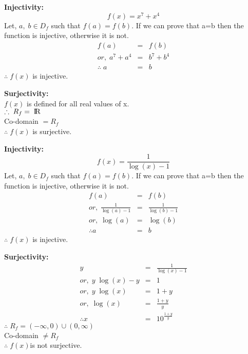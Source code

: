 \documentclass{article}
\begin{document}
\begin{minipage}[t]{0.4\linewidth}
\textbf{Injectivity:}
    $$f(x) = x^7 + x^4$$
Let, $a,\;b\in D_f$ such that $f(a) = f(b)$. If we can prove that a=b then the function is injective, otherwise it is not.
\begin{eqnarray*}
    f(a) &=& f(b)\\
    or,\;a^7+a^4 &=& b^7 + b^4\\
    \therefore\; a &=& b
\end{eqnarray*}
$\therefore\;f(x)$ is injective.
\end{minipage}\hfill
\begin{minipage}[t]{0.4\linewidth}
\textbf{Surjectivity:}
\\$f(x)$ is defined for all real values of x.\\
$\therefore\; R_f = \;\rm I\!R$
\\Co-domain $=R_f$\\
$\therefore\;f(x)$ is surjective.
\end{minipage}
\vspace{1cm}
\vspace{1cm}
\newpage

\begin{minipage}[t]{0.4\linewidth}
\textbf{Injectivity:}
    $$f(x) = \frac{1}{\log{(x)}-1}$$
Let, $a,\;b\in D_f$ such that $f(a) = f(b)$. If we can prove that a=b then the function is injective, otherwise it is not.
\begin{eqnarray*}
    f(a) &=& f(b)\\
    or,\;\frac{1}{\log{(a)}-1} &=& \frac{1}{\log{(b)}-1}\\
    or,\; \log(a) &=& \log(b)\\
    \therefore a&=&b
\end{eqnarray*}
    $\therefore\;f(x)$ is injective.
\end{minipage}\hfill
\begin{minipage}[t]{0.4\linewidth}
\textbf{Surjectivity:}
\begin{eqnarray*}
    y &=& \frac{1}{\log(x)-1}\\
    or,\; y\;\log(x)-y &=& 1\\
    or,\; y\;\log(x) &=& 1+y\\
    or,\; \log(x) &=& \frac{1+y}{y}\\
    \therefore x &=& 10^{\frac{1+y}{y}}
\end{eqnarray*}
    $\therefore\;R_f = (-\infty, 0)\cup(0,\infty)$\\
Co-domain $\ne R_f$\\
    $\therefore\;f(x)$is not surjective.
\end{minipage}
\vspace{1cm}
\vspace{1cm}
\end{document}
